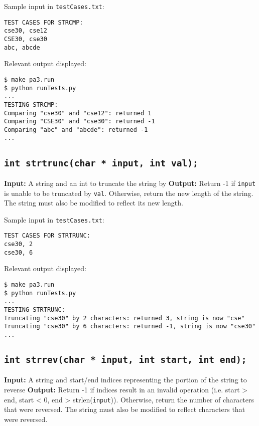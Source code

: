 \documentclass{article}
\begin{document}
\noindent Sample input in {\tt testCases.txt}:
\begin{verbatim}
TEST CASES FOR STRCMP:
cse30, cse12
CSE30, cse30
abc, abcde
\end{verbatim}

\noindent  Relevant output displayed:
\begin{verbatim}
$ make pa3.run
$ python runTests.py 
...
TESTING STRCMP:
Comparing "cse30" and "cse12": returned 1
Comparing "CSE30" and "cse30": returned -1
Comparing "abc" and "abcde": returned -1
...
\end{verbatim}

\subsection{{\tt int strtrunc(char * input, int val);}}
\textbf{Input:} A string and an int to truncate the string by \newline
\textbf{Output:} Return -1 if {\tt input} is unable to be truncated by {\tt val}. Otherwise, return the new length of the string. The string must also be modified to reflect its new length. \newline

\noindent Sample input in {\tt testCases.txt}:
\begin{verbatim}
TEST CASES FOR STRTRUNC:
cse30, 2
cse30, 6
\end{verbatim}

\noindent  Relevant output displayed:
\begin{verbatim}
$ make pa3.run
$ python runTests.py 
...
TESTING STRTRUNC:
Truncating "cse30" by 2 characters: returned 3, string is now "cse"
Truncating "cse30" by 6 characters: returned -1, string is now "cse30"
...
\end{verbatim}

\subsection{{\tt int strrev(char * input, int start, int end);}}
\textbf{Input:} A string and start/end indices representing the portion of the string to reverse \newline
\textbf{Output:} Return -1 if indices result in an invalid operation (i.e. start > end, start < 0, end > strlen({\tt input})). Otherwise, return the number of characters that were reversed. The string must also be modified to reflect characters that were reversed. \newline
\end{document}
